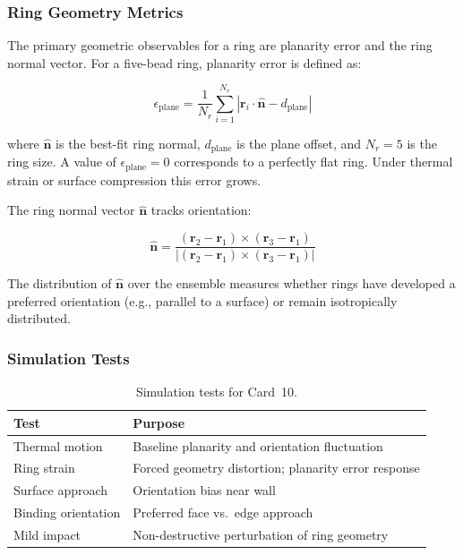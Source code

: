 \documentclass[12pt]{article}
\begin{document}
\subsubsection*{Ring Geometry Metrics}

The primary geometric observables for a ring are planarity error and
the ring normal vector.
For a five-bead ring, planarity error is defined as:

\begin{equation}
	\epsilon_{\mathrm{plane}} = \frac{1}{N_r} \sum_{i=1}^{N_r}
	\left| \mathbf{r}_i \cdot \hat{\mathbf{n}} - d_{\mathrm{plane}} \right|
	\label{eq:cpd_planarity}
\end{equation}

\noindent where $\hat{\mathbf{n}}$ is the best-fit ring normal,
$d_{\mathrm{plane}}$ is the plane offset, and $N_r = 5$ is the ring size.
A value of $\epsilon_{\mathrm{plane}} = 0$ corresponds to a perfectly flat ring.
Under thermal strain or surface compression this error grows.

The ring normal vector $\hat{\mathbf{n}}$ tracks orientation:

\begin{equation}
	\hat{\mathbf{n}} = \frac{(\mathbf{r}_2 - \mathbf{r}_1) \times
	(\mathbf{r}_3 - \mathbf{r}_1)}{
	\left| (\mathbf{r}_2 - \mathbf{r}_1) \times (\mathbf{r}_3 - \mathbf{r}_1) \right|}
	\label{eq:cpd_normal}
\end{equation}

\noindent The distribution of $\hat{\mathbf{n}}$ over the ensemble
measures whether rings have developed a preferred orientation (e.g.,
parallel to a surface) or remain isotropically distributed.

\subsubsection*{Simulation Tests}

\begin{table}[H]
\centering
\caption{Simulation tests for Card~10.}
\label{tab:cpd_tests}
\begin{tabular}{ll}
\toprule
\textbf{Test} & \textbf{Purpose} \\
\midrule
Thermal motion         & Baseline planarity and orientation fluctuation \\
Ring strain            & Forced geometry distortion; planarity error response \\
Surface approach       & Orientation bias near wall \\
Binding orientation    & Preferred face vs.\ edge approach \\
Mild impact            & Non-destructive perturbation of ring geometry \\
\bottomrule
\end{tabular}
\end{table}
\end{document}
